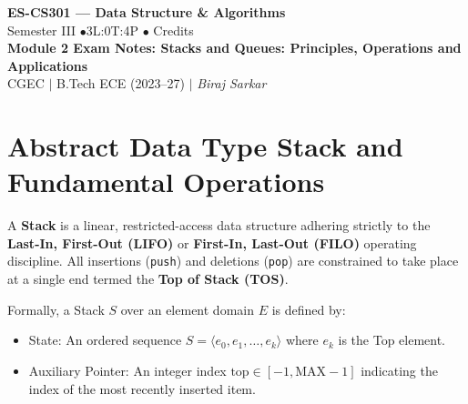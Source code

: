 \documentclass[12pt,a4paper]{article}
\begin{document}
\begin{center}
  {\LARGE\bfseries\color{myred} ES-CS301 --- Data Structure \& Algorithms}\\[5pt]
  {\normalsize\color{mydark} Semester III \quad$\bullet$\quad 3L:0T:4P \quad$\bullet$ Credits}\\[3pt]
  {\normalsize\color{myteal}\textbf{Module 2 Exam Notes: Stacks and Queues: Principles, Operations and Applications}}\\[3pt]
  {\small\color{mydark} CGEC \;$|$\; B.Tech ECE (2023--27) \;$|$\; \textit{Biraj Sarkar}}
\end{center}
\vspace{2pt}
\noindent{\color{myred}\rule{\linewidth}{1.5pt}}
\vspace{2pt}

\hypersetup{linkcolor=mydark}
\tableofcontents
\hypersetup{linkcolor=myteal}
\newpage

\section{Abstract Data Type Stack and Fundamental Operations}

\begin{tcolorbox}[defbox, title={\textbf{Definition: Stack Abstract Data Type (ADT)}}]
A \textbf{Stack} is a linear, restricted-access data structure adhering strictly to the \textbf{Last-In, First-Out (LIFO)} or \textbf{First-In, Last-Out (FILO)} operating discipline. All insertions (\texttt{push}) and deletions (\texttt{pop}) are constrained to take place at a single end termed the \textbf{Top of Stack (TOS)}.
\par\vspace{4pt}
Formally, a Stack $S$ over an element domain $E$ is defined by:
\begin{itemize}[leftmargin=*, nosep]
  \item State: An ordered sequence $S = \langle e_0, e_1, \dots, e_k \rangle$ where $e_k$ is the Top element.
  \item Auxiliary Pointer: An integer index $\text{top} \in [-1, \text{MAX}-1]$ indicating the index of the most recently inserted item.
\end{itemize}
\end{tcolorbox}
\end{document}
